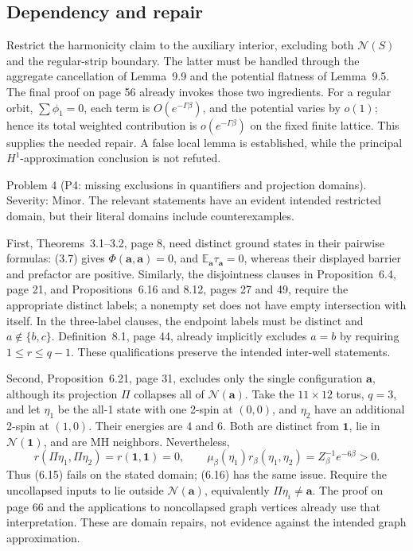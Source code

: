 \documentclass[10pt]{article}
\begin{document}
\subsection*{Dependency and repair}
Restrict the harmonicity claim to the auxiliary interior, excluding both \(\mathcal N(S)\) and the regular-strip boundary. The latter must be handled through the aggregate cancellation of Lemma 9.9 and the potential flatness of Lemma 9.5. The final proof on page 56 already invokes those two ingredients. For a regular orbit, \(\sum\phi_1=0\), each term is \(O(e^{-\Gamma\beta})\), and the potential varies by \(o(1)\); hence its total weighted contribution is \(o(e^{-\Gamma\beta})\) on the fixed finite lattice. This supplies the needed repair. A false local lemma is established, while the principal \(H^1\)-approximation conclusion is not refuted.\par
Problem 4 (P4: missing exclusions in quantifiers and projection domains).  Severity: Minor. The relevant statements have an evident intended restricted domain, but their literal domains include counterexamples.\par
First, Theorems 3.1–3.2, page 8, need distinct ground states in their pairwise formulas: (3.7) gives \(\Phi(\mathbf a,\mathbf a)=0\), and \({\mathbb E}_{\mathbf a}\tau_{\mathbf a}=0\), whereas their displayed barrier and prefactor are positive. Similarly, the disjointness clauses in Proposition 6.4, page 21, and Propositions 6.16 and 8.12, pages 27 and 49, require the appropriate distinct labels; a nonempty set does not have empty intersection with itself. In the three-label clauses, the endpoint labels must be distinct and \(a\notin\{b,c\}\). Definition 8.1, page 44, already implicitly excludes \(a=b\) by requiring \(1\leq r\leq q-1\). These qualifications preserve the intended inter-well statements.\par
Second, Proposition 6.21, page 31, excludes only the single configuration \(\mathbf a\), although its projection \(\Pi\) collapses all of \(\mathcal N(\mathbf a)\). Take the \(11\times12\) torus, \(q=3\), and let \(\eta_1\) be the all-1 state with one 2-spin at \((0,0)\), and \(\eta_2\) have an additional 2-spin at \((1,0)\). Their energies are 4 and 6. Both are distinct from \(\mathbf1\), lie in \(\mathcal N(\mathbf1)\), and are MH neighbors. Nevertheless, \[r(\Pi\eta_1,\Pi\eta_2)=r(\mathbf1,\mathbf1)=0,\qquad
 \mu_\beta(\eta_1)r_\beta(\eta_1,\eta_2)
       =Z_\beta^{-1}e^{-6\beta}>0.\] Thus (6.15) fails on the stated domain; (6.16) has the same issue. Require the uncollapsed inputs to lie outside \(\mathcal N(\mathbf a)\), equivalently \(\Pi\eta_i\ne\mathbf a\). The proof on page 66 and the applications to noncollapsed graph vertices already use that interpretation. These are domain repairs, not evidence against the intended graph approximation.\par
\end{document}
